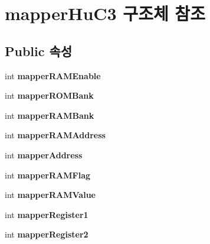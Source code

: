 \hypertarget{structmapper_hu_c3}{}\section{mapper\+Hu\+C3 구조체 참조}
\label{structmapper_hu_c3}
\subsection*{Public 속성}
\begin{DoxyCompactItemize}
\item 
\mbox{\label{structmapper_hu_c3_a86d9d7ad1d6be7d39f03d2aa5b8c57bc}} 
int {\bfseries mapper\+R\+A\+M\+Enable}
\item 
\mbox{\label{structmapper_hu_c3_a0e4220842438d77ce5ee80686ebd0e87}} 
int {\bfseries mapper\+R\+O\+M\+Bank}
\item 
\mbox{\label{structmapper_hu_c3_a75471cab85c2a3fcde2253ae1dfaaf6f}} 
int {\bfseries mapper\+R\+A\+M\+Bank}
\item 
\mbox{\label{structmapper_hu_c3_a4cf3e58fe7b61a1a718114cad6fde78d}} 
int {\bfseries mapper\+R\+A\+M\+Address}
\item 
\mbox{\label{structmapper_hu_c3_ad4b565c84b6f4900210d9d7cf717e208}} 
int {\bfseries mapper\+Address}
\item 
\mbox{\label{structmapper_hu_c3_a25465c1d3261b9b3b0522d258bca79ba}} 
int {\bfseries mapper\+R\+A\+M\+Flag}
\item 
\mbox{\label{structmapper_hu_c3_aa2d5817f57d1108acd2f845cae5311ce}} 
int {\bfseries mapper\+R\+A\+M\+Value}
\item 
\mbox{\label{structmapper_hu_c3_ab44fd5523f02d928423c47e0b1102ad6}} 
int {\bfseries mapper\+Register1}
\item 
\mbox{\label{structmapper_hu_c3_a090f938fbd955e71aeacae17062f7e28}} 
int {\bfseries mapper\+Register2}
\item 
\mbox{\label{structmapper_hu_c3_a3ac6832834e80d8a9547f034d7cad12a}} 

\end{DoxyCompactItemize}
